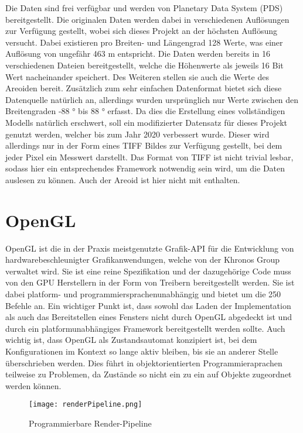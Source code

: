 Die Daten sind frei verfügbar und werden von Planetary Data System (PDS) bereitgestellt\cite{molaData}. Die originalen Daten werden dabei in verschiedenen Auflösungen zur Verfügung gestellt, wobei sich dieses Projekt an der höchsten Auflösung versucht. Dabei existieren pro Breiten- und Längengrad 128 Werte, was einer Auflösung von ungefähr 463 m entspricht. Die Daten werden bereits in 16 verschiedenen Dateien bereitgestellt, welche die Höhenwerte als jeweils 16 Bit Wert nacheinander speichert. Des Weiteren stellen sie auch die Werte des Areoiden bereit. Zusätzlich zum sehr einfachen Datenformat bietet sich diese Datenquelle natürlich an, allerdings wurden ursprünglich nur Werte zwischen den Breitengraden -88 ° bis 88 ° erfasst. Da dies die Erstellung eines vollständigen Modells natürlich erschwert, soll ein modifizierter Datensatz für dieses Projekt genutzt werden, welcher bis zum Jahr 2020 verbessert wurde\cite{molaDataExtended}. Dieser wird allerdings nur in der Form eines TIFF Bildes zur Verfügung gestellt, bei dem jeder Pixel ein Messwert darstellt. Das Format von TIFF ist nicht trivial lesbar, sodass hier ein entsprechendes Framework notwendig sein wird, um die Daten auslesen zu können. Auch der Areoid ist hier nicht mit enthalten.

\section{OpenGL}
OpenGL ist die in der Praxis meistgenutzte Grafik-API für die Entwicklung von hardwarebeschleunigter Grafikanwendungen, welche von der Khronos Group verwaltet wird. Sie ist eine reine Spezifikation und der dazugehörige Code muss von den GPU Herstellern in der Form von Treibern bereitgestellt werden. Sie ist dabei platform- und programmiersprachenunabhängig und bietet um die 250 Befehle an. Ein wichtiger Punkt ist, dass sowohl das Laden der Implementation als auch das Bereitstellen eines Fensters nicht durch OpenGL abgedeckt ist und durch ein platformunabhängiges Framework bereitgestellt werden sollte. Auch wichtig ist, dass OpenGL als Zustandsautomat konzipiert ist, bei dem Konfigurationen im Kontext so lange aktiv bleiben, bis sie an anderer Stelle überschrieben werden. Dies führt in objektorientierten Programmieraprachen teilweise zu Problemen, da Zustände so nicht ein zu ein auf Objekte zugeordnet werden können.  

\begin{wrapfigure}{R}{0.25\textwidth}
    \texttt{[image: renderPipeline.png]}
    \caption[Programmierbare Render-Pipeline]{Programmierbare Render-Pipeline\protect\footnotemark}
    \label{renderPipeline}
\end{wrapfigure}

